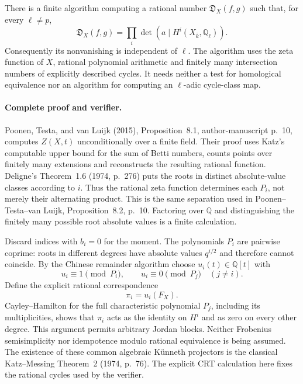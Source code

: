 There is a finite algorithm computing a rational number
\(\mathfrak D_X(f,g)\) such that, for every \(\ell\ne p\),
\[
 \mathfrak D_X(f,g)
       =\prod_i\det\!\left(a\mid
                         H^i(X_{\bar k},\mathbb Q_\ell)\right).
                                                        \tag{CC-XC.C13}
\]
Consequently its nonvanishing is independent of \(\ell\).
The algorithm uses the zeta function of \(X\), rational
polynomial arithmetic and finitely many intersection numbers
of explicitly described cycles.  It needs neither a test for
homological equivalence nor an algorithm for computing an
\(\ell\)-adic cycle-class map.

\paragraph{Complete proof and verifier.}
Poonen, Testa, and van Luijk (2015), Proposition~8.1,
author-manuscript p.~10, computes \(Z(X,t)\) unconditionally
over a finite field.  Their proof uses Katz's computable
upper bound for the sum of Betti numbers, counts points over
finitely many extensions and reconstructs the resulting
rational function.  Deligne's Theorem~1.6 (1974, p.~276)
puts the roots in distinct absolute-value classes according
to \(i\).  Thus the rational zeta function determines each
\(P_i\), not merely their alternating product.  This is the
same separation used in Poonen--Testa--van Luijk,
Proposition~8.2, p.~10.  Factoring over \(\mathbb Q\) and
distinguishing the finitely many possible root absolute
values is a finite calculation.

Discard indices with \(b_i=0\) for the moment.
The polynomials \(P_i\) are pairwise coprime: roots in
different degrees have absolute values \(q^{i/2}\) and
therefore cannot coincide.  By the Chinese remainder
algorithm choose \(u_i(t)\in\mathbb Q[t]\) with
\[
 u_i\equiv1\pmod {P_i},\qquad
 u_i\equiv0\pmod {P_j}\quad(j\ne i).
 \]
Define the explicit rational correspondence
\[
                              \pi_i=u_i(F_X).
                                                        \tag{CC-XC.C14}
\]
Cayley--Hamilton for the full characteristic polynomial
\(P_j\), including its multiplicities, shows that
\(\pi_i\) acts as the identity on \(H^i\) and as zero
on every other degree.  This argument permits arbitrary
Jordan blocks.  Neither Frobenius semisimplicity nor
idempotence modulo rational equivalence is being assumed.
The existence of these common algebraic Künneth projectors
is the classical Katz--Messing Theorem~2 (1974, p.~76).
The explicit CRT calculation here fixes the rational
cycles used by the verifier.


